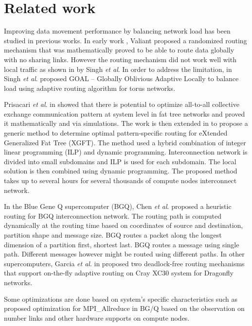 \section{Related work}
\label{sec:relatedwork}

Improving data movement performance by balancing network load has been studied in previous works. In early work \cite{Valiant81:Routing}, Valiant proposed a randomized routing mechanism that was mathematically proved to be able to route data globally with no sharing links. However the routing mechanism did not work well with local traffic as shown in \cite{singh2003:GOAL} by Singh \textit{et al}. In order to address the limitation, in \cite{singh2003:GOAL} Singh \textit{et al}. proposed GOAL -- Globally Oblivious Adaptive Locally to balance load using adaptive routing algorithm for torus networks. 

Prisacari \textit{et al}. in \cite{Prisacari13a} showed that there is potential to optimize all-to-all collective exchange communication pattern at system level in fat tree networks and proved it mathematically and via simulations. The work is then extended in \cite{Prisacari13b} to propose a generic method to determine optimal pattern-specific routing for eXtended Generalized Fat Tree (XGFT). The method used a hybrid combination of integer linear programming (ILP) and dynamic programming. Interconnection network is divided into small subdomains and ILP is used for each subdomain. The local solution is then combined using dynamic programming. The proposed method takes up to several hours for several thousands of compute nodes interconnect network.

In the Blue Gene Q supercomputer (BGQ), Chen \textit{et al}. \cite{Chen:BGQ} proposed a heuristic routing for BGQ interconnection network. The routing path is computed dynamically at the routing time based on coordinates of source and destination, partition shape and message size. BGQ routes a packet along the longest dimension of a partition first, shortest last. BGQ routes a message using single path. Different messages however might be routed using different paths. In other supercomputers, Garcia \textit{et al}. in \cite{garcia2013:CrayDragonfly} proposed two deadlock-free routing mechanisms that support on-the-fly adaptive routing on Cray XC30 system for Dragonfly networks.

Some optimizations are done based on system’s specific characteristics such as \cite{Kumar:Allreduce} proposed optimization for MPI\_Allreduce in BG/Q based on the observation on number links and other hardware supports on compute nodes.

